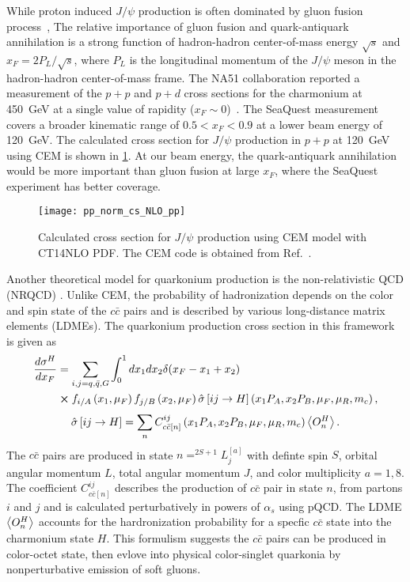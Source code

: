 \documentclass[../main.tex]{subfiles}
\begin{document}
While proton induced $J/\psi$ production is often dominated by gluon fusion
process~\cite{vogt1999}, The relative importance of gluon fusion
and quark-antiquark annihilation is a strong function of hadron-hadron center-of-mass energy $\sqrt{s}$
and $x_F=2P_L/\sqrt{s}$, where $P_L$ is the longitudinal momentum of the $J/\psi$ meson in the
hadron-hadron center-of-mass frame.
The NA51 collaboration reported a measurement of the $p+p$ and $p+d$ cross sections
for the charmonium at \SI{450}{\GeV} at a single value of rapidity ($x_F\sim 0$)~\cite{abreu1998}.
The SeaQuest measurement covers a broader kinematic range of $0.5<x_F<0.9$ at a lower beam energy
of \SI{120}{\GeV}.
The calculated cross section for $J/\psi$ production in $p+p$ at \SI{120}{\GeV} using
CEM is shown in \cref{fig:cem_cs}.
At our beam energy, the quark-antiquark annihilation would be more important than gluon fusion at large $x_F$, where
the SeaQuest experiment has better coverage.
\begin{figure}[h!]
	\centering
	\texttt{[image: pp\_norm\_cs\_NLO\_pp]}
	\caption{Calculated cross section for $J/\psi$ production using CEM model with CT14NLO PDF.
		The CEM code is obtained from Ref.~\cite{mangano1993}.}
	\label{fig:cem_cs}
\end{figure}

Another theoretical model for quarkonium production is the non-relativistic
QCD (NRQCD) \cite{bodwin1995}. Unlike CEM, the probability of
hadronization depends on the color and spin state of the $c\bar{c}$ pairs and
is described by various long-distance matrix elements (LDMEs). The quarkonium
production cross section in this framework is given as
\begin{equation}
	\begin{split}
		\frac{d\sigma^H}{dx_F} & =\sum_{i,j = q,\bar{q},G}\int^1_0 dx_1 dx_2 \delta(x_F-x_1+x_2)                                                                                        \\
		                       & \cross f_{i/A}\left(x_1,\mu_F\right)f_{j/B}\left(x_2,\mu_F\right)\hat{\sigma}\left[ij\rightarrow H\right]\left(x_1P_A,x_2P_B,\mu_F,\mu_R , m_c\right),
	\end{split}
\end{equation}
\begin{equation}
	\hat{\sigma}\left[ij\rightarrow H\right]= \sum_n C^{ij}_{c\bar{c}\left[n\right]}\left(x_1P_A,x_2P_B,\mu_F,\mu_R , m_c\right)\expval{O^H_n}.
\end{equation}
The $c\bar{c}$ pairs are produced in state $n=^{2S+1}L_j^{\left[a\right]}$ with definte spin $S$,
orbital angular momentum $L$, total angular momentum $J$, and color multiplicity $a=1,8$.
The coefficient $C^{ij}_{c\bar{c}\left[n\right]}$ describes the production of $c\bar{c}$ pair in state $n$,
from partons $i$ and $j$ and is calculated perturbatively in powers of $\alpha_s$ using pQCD.
The LDME $\expval{O^H_n}$ accounts for the hardronization probability for a specfic $c\bar{c}$ state into the
charmonium state $H$.
This formulism suggests the $c\bar{c}$ pairs can be produced in color-octet state,
then evlove into physical color-singlet quarkonia by nonperturbative emission of soft gluons.
\end{document}
